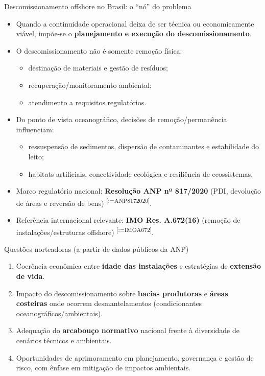 \documentclass[aspectratio=169,11pt]{beamer}
\makeatletter
\renewcommand{\cite}[1]{\textsuperscript{[\@for\@tempa:=#1\do{\@tempa,}\@gobble]}}
\makeatother
\begin{document}
\begin{frame}{Descomissionamento offshore no Brasil: o ``nó'' do problema}
\begin{itemize}
  \item Quando a continuidade operacional deixa de ser técnica ou economicamente viável, impõe-se o \textbf{planejamento e execução do descomissionamento}.
  \item O descomissionamento não é somente remoção física:
    \begin{itemize}
      \item destinação de materiais e gestão de resíduos;
      \item recuperação/monitoramento ambiental;
      \item atendimento a requisitos regulatórios.
    \end{itemize}
  \item Do ponto de vista oceanográfico, decisões de remoção/permanência influenciam:
    \begin{itemize}
      \item ressuspensão de sedimentos, dispersão de contaminantes e estabilidade do leito;
      \item habitats artificiais, conectividade ecológica e resiliência de ecossistemas.
    \end{itemize}
  \item Marco regulatório nacional: \textbf{Resolução ANP nº 817/2020} (PDI, devolução de áreas e reversão de bens) \cite{ANP8172020}.
  \item Referência internacional relevante: \textbf{IMO Res. A.672(16)} (remoção de instalações/estruturas offshore) \cite{IMOA672}.
\end{itemize}
\end{frame}

\begin{frame}{Questões norteadoras (a partir de dados públicos da ANP)}
\begin{enumerate}
  \item Coerência econômica entre \textbf{idade das instalações} e estratégias de \textbf{extensão de vida}.
  \item Impacto do descomissionamento sobre \textbf{bacias produtoras} e \textbf{áreas costeiras} onde ocorrem desmantelamentos (condicionantes oceanográficos/ambientais).
  \item Adequação do \textbf{arcabouço normativo} nacional frente à diversidade de cenários técnicos e ambientais.
  \item Oportunidades de aprimoramento em planejamento, governança e gestão de risco, com ênfase em mitigação de impactos ambientais.
\end{enumerate}
\end{frame}
\end{document}

